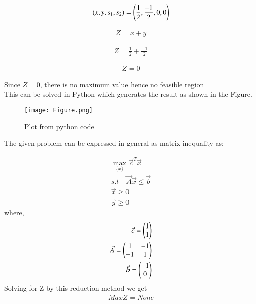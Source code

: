 \documentclass[journal,12pt,twocolumn]{IEEEtran}
\begin{document}
\begin{align}
   \left(x,y,s_1,s_2\right) = \left(\frac{1}{2},\frac{-1}{2},0,0\right)
\end{align}

\begin{align}
    Z= x+y
\end{align}

\begin {align}
Z=\frac{1}{2}+\frac{-1}{2}
\end{align}

\begin{align}
    Z=0
\end{align}

Since $Z=0$, there is no maximum value hence no feasible region\\

This can be solved in Python which generates the result as shown in the Figure. \\
\begin{figure}[h]
\renewcommand{\theenumi}{1}
\centering
\texttt{[image: Figure.png]}
\caption{Plot from python code }
\label{eq:solutions/5/1/10/Fig:1}
\end{figure}

The given problem can be expressed in general
as matrix inequality as:

\begin{align}
    \max_{\{x\}}\vec{c}^T\Vec{x}\\
    s.t \quad \Vec{A}\vec{x}\leq \vec{b} \\
    \Vec{x} \geq 0\\
    \Vec{y} \geq 0
\end{align}
where,
\begin{align}
    \Vec{c}=\begin{pmatrix}1\\1\end{pmatrix}\\
    \Vec{A}=\begin{pmatrix}1 & -1\\-1 & 1\end{pmatrix}\\
    \Vec{b}=\begin{pmatrix}-1\\0\end{pmatrix}
\end{align}
Solving for Z by this reduction method we get
\begin{align}
    Max Z = None
\end{align}
\end{document}
